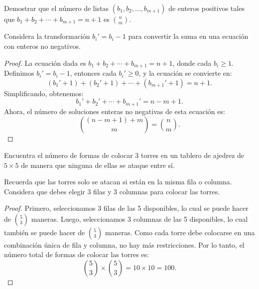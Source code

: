 \documentclass[11pt]{scrartcl}
\begin{document}
\begin{problem}
Demostrar que el número de listas $(b_1, b_2, \dots, b_{m+1})$ de enteros positivos tales que $b_1 + b_2 + \cdots + b_{m+1} = n + 1$ es $\binom{n}{m}$.
\begin{hint}
Considera la transformación $b_i' = b_i - 1$ para convertir la suma en una ecuación con enteros no negativos.
\begin{proof}
La ecuación dada es $b_1 + b_2 + \cdots + b_{m+1} = n + 1$, donde cada $b_i \geq 1$. Definimos $b_i' = b_i - 1$, entonces cada $b_i' \geq 0$, y la ecuación se convierte en:
\[
(b_1' + 1) + (b_2' + 1) + \cdots + (b_{m+1}' + 1) = n + 1.
\]
Simplificando, obtenemos:
\[
b_1' + b_2' + \cdots + b_{m+1}' = n - m + 1.
\]
Ahora, el número de soluciones enteras no negativas de esta ecuación es:
\[
\binom{(n - m + 1) + m}{m} = \binom{n}{m}.
\]
\end{proof}
\end{hint}
\end{problem}

\begin{problem}
Encuentra el número de formas de colocar 3 torres en un tablero de ajedrez de $5 \times 5$ de manera que ninguna de ellas se ataque entre sí.
\begin{hint}
Recuerda que las torres solo se atacan si están en la misma fila o columna. Considera que debes elegir 3 filas y 3 columnas para colocar las torres.
\begin{proof}
Primero, seleccionamos 3 filas de las 5 disponibles, lo cual se puede hacer de $\binom{5}{3}$ maneras. Luego, seleccionamos 3 columnas de las 5 disponibles, lo cual también se puede hacer de $\binom{5}{3}$ maneras. Como cada torre debe colocarse en una combinación única de fila y columna, no hay más restricciones. Por lo tanto, el número total de formas de colocar las torres es:
\[
\binom{5}{3} \times \binom{5}{3} = 10 \times 10 = 100.
\]
\end{proof}
\end{hint}
\end{problem}
\end{document}
